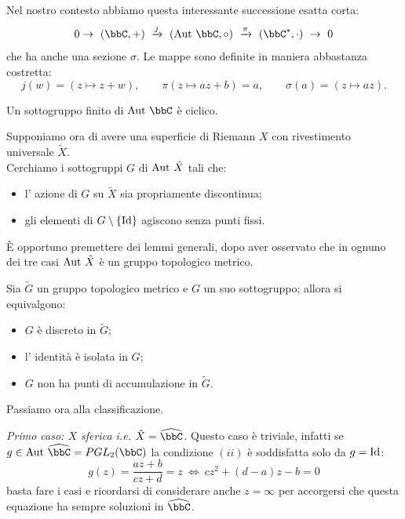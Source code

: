 Nel nostro contesto abbiamo questa interessante successione esatta corta:
$$
0\rightarrow\ (\bbC,+)\ \xrightarrow{j}\ (\Aut{\bbC},\circ)\ \xrightarrow{\pi}\ (\bbC^*,\cdot)\  \rightarrow\ 0
$$
che ha anche una sezione $\sigma$. Le mappe sono definite in maniera abbastanza costretta:
$$
j(w)=(z\mapsto z+w),\qquad \pi(z\mapsto az+b)=a,\qquad \sigma(a)=(z\mapsto az).
$$
\begin{esercizio}
Un sottogruppo finito di $\Aut{\bbC}$ è ciclico.
\end{esercizio}
Supponiamo ora di avere una superficie di Riemann $X$ con rivestimento universale $\tilde X$.\\ 
Cerchiamo i sottogruppi $G$ di $\text{Aut }{\tilde{X}}$ tali che:
\begin{itemize}
\item[(i)] l' azione di $G$ su $\tilde{X}$ sia propriamente discontinua;
\item[(ii)] gli elementi di $G\setminus\{\text{Id}\}$ agiscono senza punti fissi.
\end{itemize}
È opportuno premettere dei lemmi generali, dopo aver osservato che in ognuno dei tre casi $\text{Aut }{\tilde{X}}$ è un gruppo topologico metrico.
\begin{lemma}Sia $\tilde G$ un gruppo topologico metrico e $G$ un suo sottogruppo; allora si equivalgono:
\begin{itemize}
\item[(a)] $G$ è discreto in $\tilde G$;
\item[(b)] l' identità è isolata in $G$;
\item[(c)] $G$ non ha punti di accumulazione in $\tilde G$.
\end{itemize}
\end{lemma}

Passiamo ora alla classificazione.

{\it Primo caso: $X$ sferica i.e. $\tilde {X}=\hat{\bbC}$.} Questo caso è triviale, infatti se $g\in\Aut{\hat{\bbC}}=PGL_2(\bbC)$ la condizione $(ii)$ è soddisfatta solo da $g=\text{Id}$:
$$
g(z)=\frac{az+b}{cz+d}=z\ \Leftrightarrow\ cz^2+(d-a)z-b=0
$$
basta fare i casi e ricordarsi di considerare anche $z=\infty$ per accorgersi che questa equazione ha sempre soluzioni in $\hat{\bbC}$.


